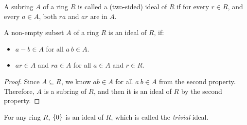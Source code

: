 \documentclass[../main.tex]{subfiles}
\begin{document}
\begin{definition}[Ideal]
  A subring $A$ of a ring $R$ is called a (two-sided) ideal of $R$ if
  for every $r \in R$, and every $a \in A$, both $ra$ and $ar$ are in $A$.
\end{definition}

\begin{theorem}
  A non-empty subset $A$ of a ring $R$ is an ideal of $R$, if:
  \begin{itemize}
    \item $a - b \in A$ for all $a \ b \in A$.
    \item $ar \in A$ and $ra \in A$ for all $a \in A$ and $r \in R$.
  \end{itemize}
\end{theorem}
\begin{proof}
  Since $A \subseteq R$, we know $ab \in A$ for all $a \ b \in A$ from the second property.
  Therefore, $A$ is a subring of $R$, and then it is an ideal of $R$ by the second property.
\end{proof}

\begin{example}
  For any ring $R$, $\{0\}$ is an ideal of $R$, which is called the \textit{trivial} ideal.
\end{example}
\end{document}
